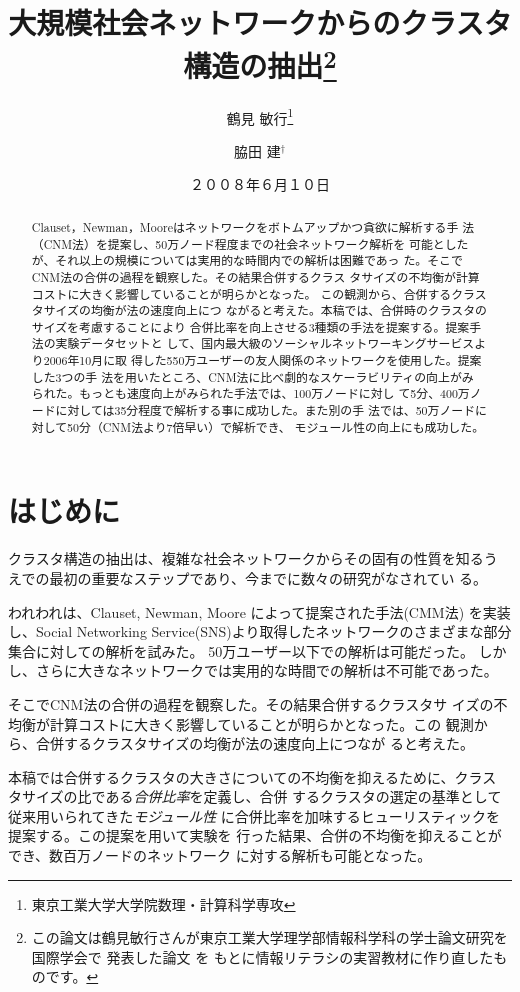 \documentclass [a4j,11pt] {jsarticle}
\title  {大規模社会ネットワークからのクラスタ構造の抽出\thanks {
  この論文は鶴見敏行さんが東京工業大学理学部情報科学科の学士論文研究を国際学会で
  発表した論文 \protect\cite {wakita-2007-finding-community-structure-in-mega-scale-social}を
  もとに情報リテラシの実習教材に作り直したものです。}}
\author {鶴見 敏行\thanks {東京工業大学大学院数理・計算科学専攻} \and 脇田 建{$^\dagger$}}
\date {２００８年６月１０日}
\begin{document}
\maketitle


\begin {abstract}
Clauset，Newman，Mooreはネットワークをボトムアップかつ貪欲に解析する手
法（CNM法）を提案し、50万ノード程度までの社会ネットワーク解析を
可能としたが、それ以上の規模については実用的な時間内での解析は困難であっ
た。そこでCNM法の合併の過程を観察した。その結果合併するクラス
タサイズの不均衡が計算コストに大きく影響していることが明らかとなった。
この観測から、合併するクラスタサイズの均衡が法の速度向上につ
ながると考えた。本稿では、合併時のクラスタのサイズを考慮することにより
合併比率を向上させる3種類の手法を提案する。提案手法の実験データセットと
して、国内最大級のソーシャルネットワーキングサービスより2006年10月に取
得した550万ユーザーの友人関係のネットワークを使用した。提案した3つの手
法を用いたところ、CNM法に比べ劇的なスケーラビリティの向上がみ
られた。もっとも速度向上がみられた手法では、100万ノードに対し
て5分、400万ノードに対しては35分程度で解析する事に成功した。また別の手
法では、50万ノードに対して50分（CNM法より7倍早い）で解析でき、
モジュール性の向上にも成功した。
\end {abstract}

\section {はじめに}
\label {sect: はじめに}


クラスタ構造の抽出は、複雑な社会ネットワークからその固有の性質を知るう
えでの最初の重要なステップであり、今までに数々の研究がなされてい
る。
\cite{Kleinberg99,
  Page99,
  Dean99,
  Kumar99,
  Miller01,
  Toyoda01,
  Wu04,
  Cai04,
  Clauset04,
  Onsjo06}


われわれは、Clauset, Newman, Moore によって提案された手法(CMM法)
\cite{Clauset04}
を実装し、Social Networking Service(SNS)より取得したネットワークのさまざまな部分集合に対しての解析を試みた。
50万ユーザー以下での解析は可能だった。
しかし、さらに大きなネットワークでは実用的な時間での解析は不可能であった。

そこでCNM法の合併の過程を観察した。その結果合併するクラスタサ
イズの不均衡が計算コストに大きく影響していることが明らかとなった。この
観測から、合併するクラスタサイズの均衡が法の速度向上につなが
ると考えた。

本稿では合併するクラスタの大きさについての不均衡を抑えるために、クラス
タサイズの比である\emph {合併比率}を定義し、合併
するクラスタの選定の基準として従来用いられてきた{\em モジュール性}
に合併比率を加味するヒューリスティックを提案する。この提案を用いて実験を
行った結果、合併の不均衡を抑えることができ、数百万ノードのネットワーク
に対する解析も可能となった。
\end{document}

